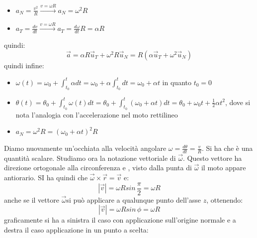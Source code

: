 \documentclass[a4paper,12pt, oneside]{book}
\begin{document}
\begin{itemize}
	\item $a_N=\frac{v^2}{R}\xrightarrow{v=\omega R} a_N=\omega^2 R$
	\item $a_T=\frac{dv}{dt}\xrightarrow{v=\omega R} a_T=\frac{d\omega}{dt}R=\alpha R$
\end{itemize}
quindi:
$$\vec{a}=\alpha R\vec{u}_T+\omega^2 R\vec{u}_N= R(\alpha \vec{u}_T+\omega^2 \vec{u}_N)$$
quindi infine:
\begin{itemize}
	\item $\omega(t)=\omega_0+\int_{t_0}^t \alpha dt=\omega_0+\alpha \int_{t_0}^t dt=\omega_0+\alpha t$ in quanto $t_0=0$
	\item $\theta(t)=\theta_0+\int_{t_0}^t \omega (t)dt=\theta_0+\int_{t_0}^t (\omega_0+\alpha t)dt=\theta_0+\omega_0t+\frac{1}{2}\alpha t^2$, dove si nota l'analogia con l'accelerazione nel moto rettilineo
	\item $a_N=\omega^2 R=(\omega_0+\alpha t)^2 R$
\end{itemize}
Diamo nuovamente un'occhiata alla velocità angolare $\omega=\frac{d\theta}{dt}=\frac{v}{R}$. Si ha che è una quantità scalare. Studiamo ora la notazione vettoriale di $\vec{\omega}$. Questo vettore ha direzione ortogonale alla circonferenza e , visto dalla punta di $\vec{\omega}$ il moto appare antiorario. SI ha quindi che $\vec{\omega}\times \vec{r}=\vec{v}$ e:
$$|\vec{v}|=\omega Rsin\,\frac{\pi}{2}=\omega R$$
anche se il vettore $\vec{\omega}$si può applicare a qualunque punto dell'asse $z$, ottenendo:
$$|\vec{v}|=\omega Rsin\,\phi=\omega R$$
\newpage
graficamente si ha a sinistra il caso con applicazione sull'origine normale e a destra il caso applicazione in un punto a scelta:
\end{document}

